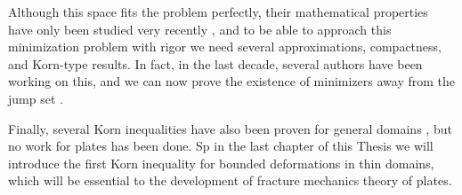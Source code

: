 Although this space fits the problem perfectly, their mathematical properties have only been studied very recently \cite{Ambrosio1997, RogerBook, RogerPaper}, and to be able to approach this minimization problem with rigor we need several approximations, compactness, and Korn-type results. In fact, in the last decade, several authors have been working on this, and we can now prove the existence of minimizers away from the jump set \cite{FracExistence}.

Finally, several Korn inequalities have also been proven for general domains \cite{kornBD1, kornBD2,
kornBD3}, but no work for plates has been done. Sp in the last chapter of this Thesis we will introduce the first Korn inequality for bounded deformations in thin domains, which will be essential to the development of fracture mechanics theory of plates.
